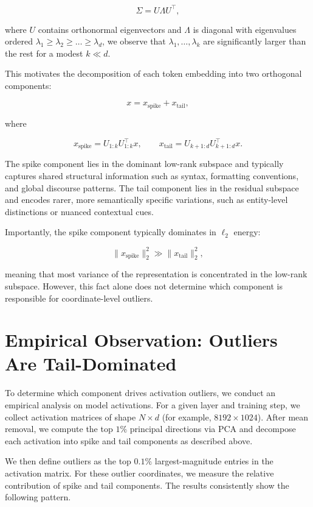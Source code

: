 \[
\Sigma = U \Lambda U^\top,
\]

where $U$ contains orthonormal eigenvectors and $\Lambda$ is diagonal with eigenvalues ordered $\lambda_1 \ge \lambda_2 \ge \dots \ge \lambda_d$, we observe that $\lambda_1, \dots, \lambda_k$ are significantly larger than the rest for a modest $k \ll d$.

This motivates the decomposition of each token embedding into two orthogonal components:

\[
x = x_{\text{spike}} + x_{\text{tail}},
\]

where

\[
x_{\text{spike}} = U_{1:k} U_{1:k}^\top x, \qquad
x_{\text{tail}} = U_{k+1:d} U_{k+1:d}^\top x.
\]

The spike component lies in the dominant low-rank subspace and typically captures shared structural information such as syntax, formatting conventions, and global discourse patterns. The tail component lies in the residual subspace and encodes rarer, more semantically specific variations, such as entity-level distinctions or nuanced contextual cues.

Importantly, the spike component typically dominates in $\ell_2$ energy:

\[
\|x_{\text{spike}}\|_2^2 \gg \|x_{\text{tail}}\|_2^2,
\]

meaning that most variance of the representation is concentrated in the low-rank subspace. However, this fact alone does not determine which component is responsible for coordinate-level outliers.

\section{Empirical Observation: Outliers Are Tail-Dominated}

To determine which component drives activation outliers, we conduct an empirical analysis on model activations. For a given layer and training step, we collect activation matrices of shape $N \times d$ (for example, $8192 \times 1024$). After mean removal, we compute the top $1\%$ principal directions via PCA and decompose each activation into spike and tail components as described above.

We then define outliers as the top $0.1\%$ largest-magnitude entries in the activation matrix. For these outlier coordinates, we measure the relative contribution of spike and tail components. The results consistently show the following pattern.

